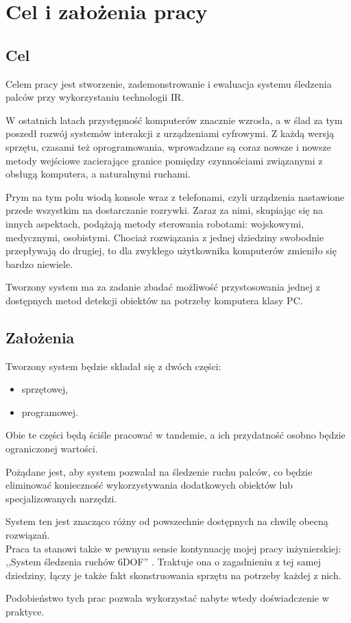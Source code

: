 \chapter{Cel i założenia pracy}\label{ch:purpose}

\section{Cel}

Celem pracy jest stworzenie, zademonstrowanie i ewaluacja systemu śledzenia palców przy wykorzystaniu technologii IR.

W ostatnich latach przystępność komputerów znacznie wzrosła, a w ślad za tym poszedł rozwój systemów interakcji z urządzeniami cyfrowymi. Z każdą wersją sprzętu, czasami też oprogramowania, wprowadzane są coraz nowsze i nowsze metody wejściowe zacierające granice pomiędzy czynnościami związanymi z obsługą komputera, a naturalnymi ruchami.

Prym na tym polu wiodą konsole wraz z telefonami, czyli urządzenia nastawione przede wszystkim na dostarczanie rozrywki. Zaraz za nimi, skupiając się na innych aspektach, podążają metody sterowania robotami: wojskowymi, medycznymi, osobistymi. Chociaż rozwiązania z jednej dziedziny swobodnie przepływają do drugiej, to dla zwykłego użytkownika komputerów zmieniło się bardzo niewiele.

Tworzony system ma za zadanie zbadać możliwość przystosowania jednej z dostępnych metod detekcji obiektów na potrzeby komputera klasy PC.\\

\section{Założenia}

Tworzony system będzie składał się z dwóch części:
\begin{itemize}
 \item sprzętowej,
 \item programowej.
\end{itemize}

Obie te części będą ściśle pracować w tandemie, a ich przydatność osobno będzie ograniczonej wartości.

Pożądane jest, aby system pozwalał na śledzenie ruchu palców, co będzie eliminować konieczność wykorzystywania dodatkowych obiektów lub specjalizowanych narzędzi.

System ten jest znacząco różny od powszechnie dostępnych na chwilę obecną rozwiązań.\\

Praca ta stanowi także w pewnym sensie kontynuację mojej pracy inżynierskiej: ,,System śledzenia ruchów 6DOF'' \cite{inz}.
Traktuje ona o zagadnieniu z tej samej dziedziny, łączy je także fakt skonstruowania sprzętu na potrzeby każdej z nich.

Podobieństwo tych prac pozwala wykorzystać nabyte wtedy doświadczenie w praktyce.
